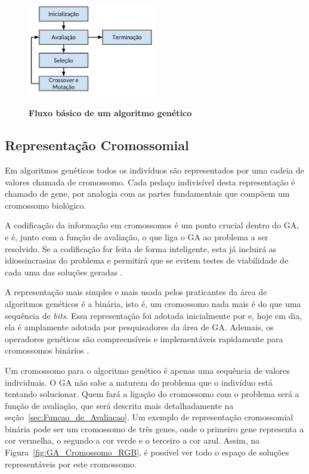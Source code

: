 \documentclass[12pt,oneside,a4paper,english,french,spanish,brazil,]{abntex2}
\begin{document}
\begin{figure}[ht]
\centering
\caption{\textbf{Fluxo básico de um algoritmo genético}}
\includegraphics[width=0.5\textwidth]{imagens/GA_Fluxo.pdf}
\label{fig:GA_luxo}
\end{figure}

\subsection{Representação Cromossomial}

Em algoritmos genéticos todos os indivíduos são representados por uma cadeia de valores chamada de cromossomo. Cada pedaço indivisível desta representação é chamado de gene, por analogia com as partes fundamentais que compõem um cromossomo biológico.

A codificação da informação em cromossomos é um ponto crucial dentro do GA, e é, junto com a função de avaliação, o que liga o GA ao problema a ser resolvido. Se a codificação for feita de forma inteligente, esta já incluirá as idiossincrasias do problema e permitirá que se evitem testes de viabilidade de cada uma das soluções geradas \cite{linden:2008}.

A representação mais simples e mais usada pelos praticantes da área de algoritmos genéticos é a binária, isto é, um cromossomo nada mais é do que uma sequência de \textit{bits}. Essa representação foi adotada inicialmente por \citet{holland:1992} e, hoje em dia, ela é amplamente adotada por pesquisadores da área de GA. Ademais, os operadores genéticos são compreensíveis e implementáveis rapidamente para cromossomos binários \cite{linden:2008}.

Um cromossomo para o algoritmo genético é apenas uma sequência de valores individuais. O GA não sabe a natureza do problema que o indivíduo está tentando solucionar. Quem fará a ligação do cromossomo com o problema será a função de avaliação, que será descrita mais detalhadamente na seção~\ref{sec:Funcao_de_Avaliacao}. Um exemplo de representação cromossomial binária pode ser um cromossomo de três genes, onde o primeiro gene representa a cor vermelha, o segundo a cor verde e o terceiro a cor azul. Assim, na Figura~\ref{fig:GA_Cromossomo_RGB}, é possível ver todo o espaço de soluções representáveis por este cromossomo.
\end{document}
